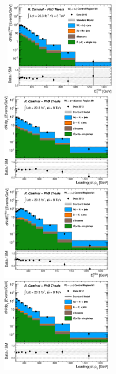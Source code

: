\begin{figure}[!ht]
  \begin{center}
    \mbox{
      \includegraphics[width=0.495\textwidth]{MonojetAnalysis/Figures/plot_Stop_A6_CRele_met.eps}
      \includegraphics[width=0.495\textwidth]{MonojetAnalysis/Figures/plot_Stop_A6_CRele_pt1.eps}
    }
    \mbox{
      \includegraphics[width=0.495\textwidth]{MonojetAnalysis/Figures/plot_Stop_A6_CRwmn_met.eps}
      \includegraphics[width=0.495\textwidth]{MonojetAnalysis/Figures/plot_Stop_A6_CRwmn_pt1.eps}
}
\end{center}
\end{figure}
